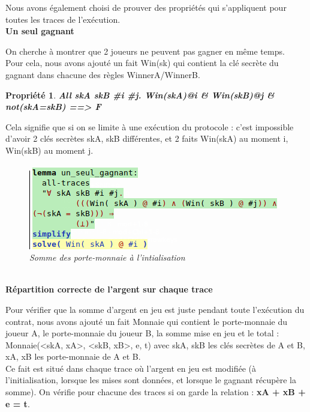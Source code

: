 \documentclass[conference]{IEEEtran}
\newtheorem{theo}{Propriété}
\begin{document}
\vspace{0.2cm}
Nous avons également choisi de prouver des propriétés qui s'appliquent pour toutes les traces de l'exécution.
\newpage
\vspace{0.3cm}\\
\textbf{Un seul gagnant} 

On cherche à montrer que 2 joueurs ne peuvent pas gagner en même temps. \\
Pour cela, nous avons ajouté un fait Win(sk) qui contient la clé secrète du gagnant dans chacune des règles WinnerA/WinnerB.
\vspace{0.2cm}
\begin{theo}
\textbf{All skA skB #i #j. Win(skA)@i & Win(skB)@j & not(skA=skB) ==> F}
\end{theo}
\vspace{0.3cm}
Cela signifie que si on se limite à une exécution du protocole : c'est impossible d'avoir 2 clés secrètes skA, skB différentes, et 2 faits Win(skA) au moment i, Win(skB) au moment j.

\begin{figure}[!h]
    \centering
    \includegraphics[scale=0.62]{ungagnant.png}
    \caption{\textit{Somme des porte-monnaie à l'intialisation}}
    \label{fig:my_label}
\end{figure}\\

\textbf{Répartition correcte de l'argent sur chaque trace} 

Pour vérifier que la somme d'argent en jeu est juste pendant toute l'exécution du contrat, nous avons ajouté un fait Monnaie qui contient le porte-monnaie du joueur A, le porte-monnaie du joueur B, la somme mise en jeu et le total : Monnaie(<skA, xA>, <skB, xB>, e, t) avec skA, skB les clés secrètes de A et B, xA, xB les porte-monnaie de A et B. \\

Ce fait est situé dans chaque trace où l'argent en jeu est modifiée (à l'initialisation, lorsque les mises sont données, et lorsque le gagnant récupère la somme). On vérifie pour chacune des traces si on garde la relation : \textbf{xA + xB + e = t}.\\
\end{document}
